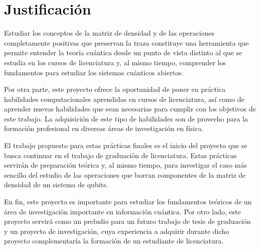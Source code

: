 \section*{Justificación}
Estudiar los conceptos de la matriz de densidad y de las operaciones completamente
positivas que preservan la traza constituye una herramienta que permite 
entender la teoría cuántica desde un punto de vista distinto al que se estudia
en los cursos de licenciatura y, al mismo tiempo, comprender los fundamentos 
para estudiar los sistemas cuánticos abiertos. 

Por otra parte, este proyecto ofrece la oportunidad de poner en práctica habilidades
computacionales aprendidas en cursos de licenciatura, así como de 
aprender nuevas habilidades que sean necesarias para cumplir con los objetivos
de este trabajo. La adquisición de este tipo de habilidades son de provecho para la formación 
profesional en diversas áreas de investigación en física. 

El trabajo propuesto para estas prácticas finales es el inicio del proyecto
que se busca continuar en el trabajo de graduación de licenciatura. 
Estas prácticas servirán de preparación teórica y, al mismo tiempo, 
para investigar el caso más sencillo del estudio de las operaciones 
que borran componentes de la matriz de densidad de un sistema 
de qubits.

En fin, este proyecto es importante para estudiar los fundamentos teóricos
de un área de investigación importante en información cuántica. 
Por otro lado, este proyecto servirá como un preludio para un futuro trabajo de
tesis de graduación y un proyecto de investigación, cuya experiencia a adquirir durante
dicho proyecto complementaría la formación de un estudiante de licenciatura. 


